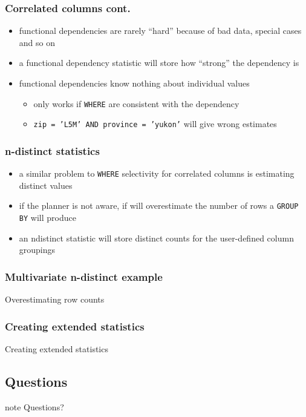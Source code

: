 \documentclass{beamer}
\begin{document}
\begin{frame}
  \frametitle{Correlated columns cont.}

  \begin{itemize}
  \item functional dependencies are rarely \alert{``hard''} because of bad
    data, special cases and so on
  \item a functional dependency statistic will store how
    \alert{``strong''} the dependency is
  \item functional dependencies know nothing about \alert{individual values}
    \begin{itemize}
    \item only works if \texttt{WHERE} are \alert{consistent} with the dependency
    \item \texttt{zip = 'L5M' AND province = 'yukon'} will give \alert{wrong}
      estimates
    \end{itemize}
  \end{itemize}
\end{frame}

\begin{frame}
  \frametitle{n-distinct statistics}

  \begin{itemize}
  \item a similar problem to \texttt{WHERE} selectivity for correlated columns
    is estimating \alert{distinct values}
  \item if the planner is not aware, if will \alert{overestimate} the number of rows a \texttt{GROUP BY} will produce
  \item an \alert{ndistinct} statistic will store distinct counts for the
    user-defined \alert{column groupings}
  \end{itemize}
\end{frame}

\begin{frame}
  \frametitle{Multivariate n-distinct example}

  \begin{block}{Overestimating row counts}
    
  \end{block}
\end{frame}

\begin{frame}
  \frametitle{Creating extended statistics}

  \begin{block}{Creating extended statistics}
    
  \end{block}
\end{frame}

\subsection*{Questions}

\begin{frame}
\begin{beamercolorbox}[center]{note}
  \Huge Questions?
\end{beamercolorbox}
\end{frame}
\end{document}
